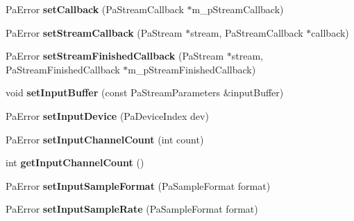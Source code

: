 \begin{DoxyCompactItemize}
\item 
\hypertarget{class_port_audio_wrap_a2a40702f7b56abb4b6927fb6493db92e}{Pa\-Error {\bfseries set\-Callback} (Pa\-Stream\-Callback $\ast$m\-\_\-p\-Stream\-Callback)}\label{class_port_audio_wrap_a2a40702f7b56abb4b6927fb6493db92e}

\item 
\hypertarget{class_port_audio_wrap_adf02f262bcd9f85c33fea7da0e4cd841}{Pa\-Error {\bfseries set\-Stream\-Callback} (Pa\-Stream $\ast$stream, Pa\-Stream\-Callback $\ast$callback)}\label{class_port_audio_wrap_adf02f262bcd9f85c33fea7da0e4cd841}

\item 
\hypertarget{class_port_audio_wrap_a85e2c0e5700cacd09a330cd6573cff7d}{Pa\-Error {\bfseries set\-Stream\-Finished\-Callback} (Pa\-Stream $\ast$stream, Pa\-Stream\-Finished\-Callback $\ast$m\-\_\-p\-Stream\-Finished\-Callback)}\label{class_port_audio_wrap_a85e2c0e5700cacd09a330cd6573cff7d}

\item 
\hypertarget{class_port_audio_wrap_a132273a300efd015cf3d66ee5b250216}{void {\bfseries set\-Input\-Buffer} (const Pa\-Stream\-Parameters \&input\-Buffer)}\label{class_port_audio_wrap_a132273a300efd015cf3d66ee5b250216}

\item 
\hypertarget{class_port_audio_wrap_abf1e9b6f6b6e09df0b926c7995963575}{Pa\-Error {\bfseries set\-Input\-Device} (Pa\-Device\-Index dev)}\label{class_port_audio_wrap_abf1e9b6f6b6e09df0b926c7995963575}

\item 
\hypertarget{class_port_audio_wrap_ac14a25862172c41c0186add676842859}{Pa\-Error {\bfseries set\-Input\-Channel\-Count} (int count)}\label{class_port_audio_wrap_ac14a25862172c41c0186add676842859}

\item 
\hypertarget{class_port_audio_wrap_a70ee9d33e7aecf0c2844060dc7628037}{int {\bfseries get\-Input\-Channel\-Count} ()}\label{class_port_audio_wrap_a70ee9d33e7aecf0c2844060dc7628037}

\item 
\hypertarget{class_port_audio_wrap_aaa979ac038d7cea196a012484aa84623}{Pa\-Error {\bfseries set\-Input\-Sample\-Format} (Pa\-Sample\-Format format)}\label{class_port_audio_wrap_aaa979ac038d7cea196a012484aa84623}

\item 
\hypertarget{class_port_audio_wrap_af20b6e10b5e67bbc71a0ce405688d19c}{Pa\-Error {\bfseries set\-Input\-Sample\-Rate} (Pa\-Sample\-Format format)}\label{class_port_audio_wrap_af20b6e10b5e67bbc71a0ce405688d19c}


\end{DoxyCompactItemize}
